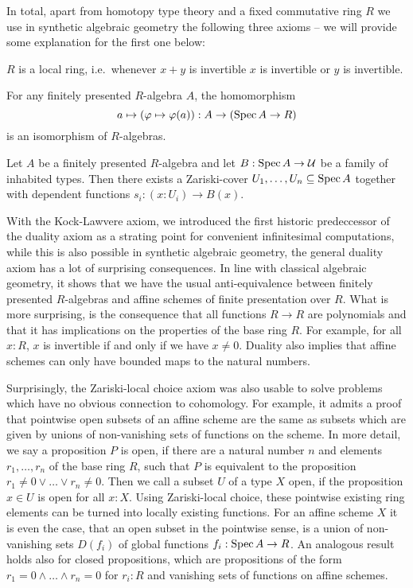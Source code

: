 In total, apart from homotopy type theory and a fixed commutative ring $R$ we use in synthetic algebraic geometry the following three axioms -- we will provide some explanation for the first one below:

\begin{center}
\begin{axiom}[Locality]%
  \label{loc-axiom}
  $R$ is a local ring, i.e.\ whenever $x+y$ is invertible $x$ is invertible or $y$ is invertible.
\end{axiom}

\begin{axiom}[Duality]%
  \label{duality-axiom}
  For any finitely presented $R$-algebra $A$, the homomorphism
  \[ a \mapsto (\varphi\mapsto \varphi(a)) : A \to (\operatorname{Spec} A \to R)\]
  is an isomorphism of $R$-algebras.
\end{axiom}

\begin{axiom}%
  \label{Z-choice-axiom}
  Let $A$ be a finitely presented $R$-algebra
  and let $B : \operatorname{Spec} A \to \mathcal{U}$ be a family of inhabited types.
  Then there exists a Zariski-cover $U_1,\dots,U_n\subseteq \operatorname{Spec} A$
  together with dependent functions $s_i : (x : U_i)\to B(x)$.
\end{axiom}
\end{center}

With the Kock-Lawvere axiom, we introduced the first historic predeccessor of the duality axiom as a strating point for convenient infinitesimal computations,
while this is also possible in synthetic algebraic geometry, the general duality axiom has a lot of surprising consequences.
In line with classical algebraic geometry, it shows that we have the usual anti-equivalence between finitely presented $R$-algebras and affine schemes of finite presentation over $R$.
What is more surprising, is the consequence that all functions $R\to R$ are polynomials and that it has implications on the properties of the base ring $R$.
For example, for all $x:R$, $x$ is invertible if and only if we have $x\neq 0$.
Duality also implies that affine schemes can only have bounded maps to the natural numbers.

Surprisingly, the Zariski-local choice axiom was also usable to solve problems which have no obvious connection to cohomology.
For example, it admits a proof that pointwise open subsets of an affine scheme are the same as subsets which are given by unions of non-vanishing sets of functions on the scheme.
In more detail, we say a proposition $P$ is open, if there are a natural number $n$ and elements $r_1,\dots,r_n$ of the base ring $R$,
such that $P$ is equivalent to the proposition $r_1\neq 0 \vee\dots\vee r_n\neq 0$.
Then we call a subset $U$ of a type $X$ open, if the proposition $x\in U$ is open for all $x:X$.
Using Zariski-local choice, these pointwise existing ring elements can be turned into locally existing functions.
For an affine scheme $X$ it is even the case, that an open subset in the pointwise sense, is a union of non-vanishing sets $D(f_i)$ of global functions $f_i:\operatorname{Spec} A \to R$.
An analogous result holds also for closed propositions, which are propositions of the form $r_1=0\wedge\dots\wedge r_n=0$ for $r_i:R$ and vanishing sets of functions on affine schemes.

